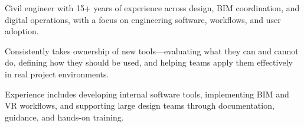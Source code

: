 
Civil engineer with 15+ years of experience across design, BIM coordination, and digital operations, with a focus on engineering software, workflows, and user adoption.

Consistently takes ownership of new tools—evaluating what they can and cannot do, defining how they should be used, and helping teams apply them effectively in real project environments.

Experience includes developing internal software tools, implementing BIM and VR workflows, and supporting large design teams through documentation, guidance, and hands-on training.